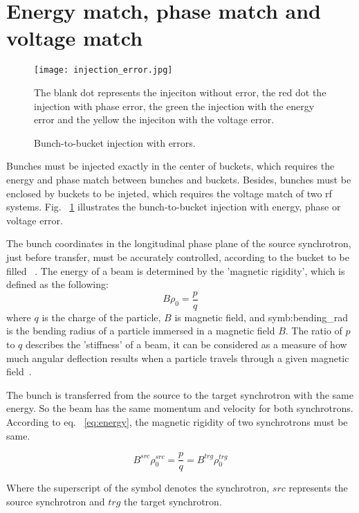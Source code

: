 \section{Energy match, phase match and voltage match}
\begin{figure}[!htb]
   \centering   
   \texttt{[image: injection\_error.jpg]}
   \caption{Bunch-to-bucket injection with errors.}{The blank dot represents the injeciton without error, the red dot the injection with phase error, the green the injection with the energy error and the yellow the injeciton with the voltage error.}
   \label{injection_error}
\end{figure} 
Bunches must be injected exactly in the center of buckets, which requires the energy and phase match between bunches and buckets. Besides, bunches must be enclosed by buckets to be injeted, which requires the voltage match of two rf systems. Fig. ~\ref{injection_error} illustrates the bunch-to-bucket injection with energy, phase or voltage error. 

The bunch coordinates in the longitudinal phase plane of the source synchrotron, just before transfer, must be accurately controlled, according to the bucket to be filled ~\cite{garoby_timing_1984}. The energy of a beam is determined by the 'magnetic rigidity', which is defined as the following:
\begin{equation}
	\label{eq:energy}
	B\rho_0 =\frac{p}{q}
\end{equation}
where $q$ is the charge of the particle, $B$ is magnetic field, and \gls{symb:bending_rad} is the bending radius of a particle immersed in a magnetic field $B$. The ratio of $p$ to $q$ describes the 'stiffness’ of a beam, it can be considered as a measure of how much angular deflection results when a particle travels through a given magnetic field~\cite{barletta_overview_????}.

The bunch is transferred from the source to the target synchrotron with the same energy. So the beam has the same momentum and velocity for both synchrotrons. According to eq. ~\ref{eq:energy}, the magnetic rigidity of two synchrotrons must be same.

\begin{equation}
	\label{eq:rigidity}
	B^{\mathit{src}}\rho_0^{\mathit{src}} =\frac{p}{q}=B^{\mathit{trg}}\rho_0^{\mathit{trg}}
\end{equation}

Where the superscript of the symbol denotes the synchrotron, $\mathit{src}$ represents the source synchrotron and $\mathit{trg}$ the target synchrotron.

